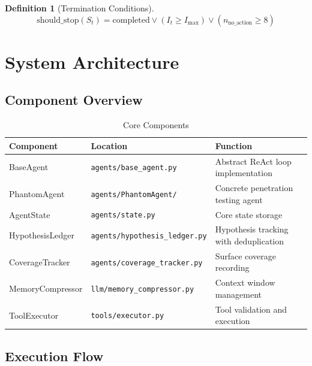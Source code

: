 \documentclass[11pt,a4paper]{article}
\theoremstyle{definition}
\newtheorem{definition}{Definition}[section]
\newcommand{\code}[1]{\texttt{#1}}
\begin{document}
\begin{definition}[Termination Conditions]
\begin{equation}
\text{should\_stop}(S_t) = \text{completed} \lor (I_t \geq I_{\text{max}}) \lor (n_{\text{no\_action}} \geq 8)
\end{equation}
\end{definition}

\section{System Architecture}
\label{sec:architecture}

\subsection{Component Overview}

\begin{table}[H]
\centering
\caption{Core Components}
\label{tab:components}
\begin{tabularx}{\textwidth}{@{}l l X@{}}
\toprule
\textbf{Component} & \textbf{Location} & \textbf{Function} \\
\midrule
BaseAgent & \code{agents/base\_agent.py} & Abstract ReAct loop implementation \\
PhantomAgent & \code{agents/PhantomAgent/} & Concrete penetration testing agent \\
AgentState & \code{agents/state.py} & Core state storage \\
HypothesisLedger & \code{agents/hypothesis\_ledger.py} & Hypothesis tracking with deduplication \\
CoverageTracker & \code{agents/coverage\_tracker.py} & Surface coverage recording \\
MemoryCompressor & \code{llm/memory\_compressor.py} & Context window management \\
ToolExecutor & \code{tools/executor.py} & Tool validation and execution \\
\bottomrule
\end{tabularx}
\end{table}

\subsection{Execution Flow}
\end{document}
